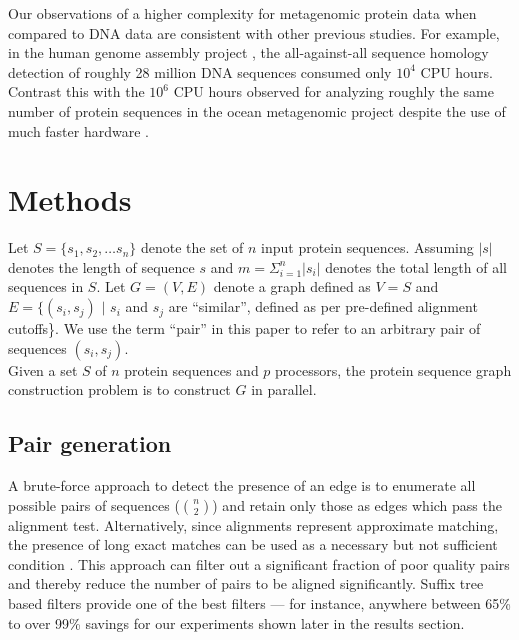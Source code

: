 \documentclass[10pt,journal,letterpaper,compsoc]{IEEEtran}
\begin{document}
Our observations of a higher complexity for metagenomic protein data when compared to DNA data are consistent with other previous studies. For example, in the human genome assembly project \cite{Venter01}, the all-against-all sequence homology detection of roughly 28 million DNA sequences consumed only $10^4$ CPU hours. Contrast this with the $10^6$ CPU hours observed for analyzing roughly the same number of protein sequences in the ocean metagenomic project despite the use of much faster hardware \cite{Yooseph07}.


\section{Methods}
\label{secMethods}

 Let $S=\{s_1,s_2,\ldots s_n\}$ denote the set of $n$ input protein sequences. Assuming $|s|$ denotes the length of sequence $s$ and $m=\Sigma_{i=1}^n |s_i|$ denotes the total length of all sequences in $S$. Let $G=(V,E)$ denote a graph defined as $V=S$ and $E=\{(s_i,s_j)$ $|$ $s_i$ and $s_j$ are ``similar'', defined as per pre-defined alignment cutoffs\}. We use the term ``pair'' in this paper to refer to an arbitrary pair of sequences $(s_i,s_j)$. \\

 Given a set $S$ of $n$ protein sequences and $p$ processors, the protein sequence graph construction problem is to construct $G$ in parallel.\\




\subsection{Pair generation}
\label{secGeneratingPairs}

A brute-force approach to detect the presence of an edge is to enumerate all possible  pairs of sequences ($n\choose 2$) and retain only those as edges which pass the alignment test. Alternatively, since alignments represent approximate matching, the presence of long exact matches can be used as a necessary but not sufficient condition \cite{Kalyanaraman07}. This approach can filter out a significant fraction of poor quality pairs and thereby reduce the number of pairs to be aligned significantly. Suffix tree based filters provide one of the best filters --- for instance, anywhere between 65\% to over 99\% savings for our experiments shown later in the results section. 
\end{document}
